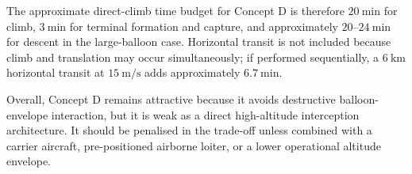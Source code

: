 The approximate direct-climb time budget for Concept D is therefore \(20~\mathrm{min}\) for climb, \(3~\mathrm{min}\) for terminal formation and capture, and approximately \(20\)--\(24~\mathrm{min}\) for descent in the large-balloon case. Horizontal transit is not included because climb and translation may occur simultaneously; if performed sequentially, a \(6~\mathrm{km}\) horizontal transit at \(15~\mathrm{m/s}\) adds approximately \(6.7~\mathrm{min}\).

Overall, Concept D remains attractive because it avoids destructive balloon-envelope interaction, but it is weak as a direct high-altitude interception architecture. It should be penalised in the trade-off unless combined with a carrier aircraft, pre-positioned airborne loiter, or a lower operational altitude envelope.





